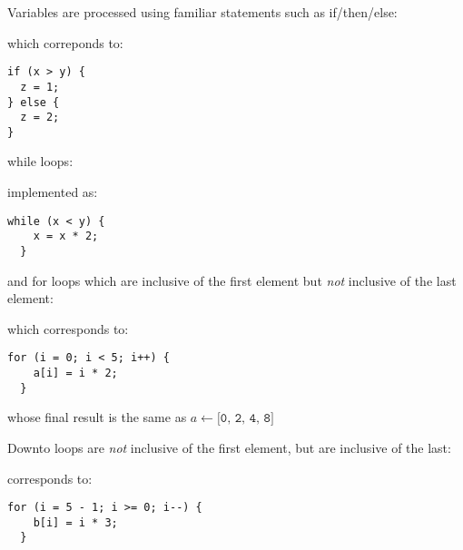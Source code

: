 \clearpage

\noindent
Variables are processed using familiar statements such as if/then/else:
\par
\noindent
\begin{algorithm}[H]
  \DontPrintSemicolon
\end{algorithm}
\par
\noindent
which correponds to:
\begin{Verbatim}[xleftmargin=.25in]
if (x > y) {
  z = 1;
} else {
  z = 2;
}
\end{Verbatim}
while loops:
\par
\noindent
\begin{algorithm}[H]
  \DontPrintSemicolon
\end{algorithm}
\par
\noindent
implemented as:
\begin{Verbatim}[xleftmargin=.25in]
  while (x < y) {
    x = x * 2;
  }
\end{Verbatim}
and for loops which are inclusive of the first element
but \textit{not} inclusive of the last element:
\par
\noindent
\begin{algorithm}[H]
  \DontPrintSemicolon
\end{algorithm}
\par
\noindent
which corresponds to:
\begin{Verbatim}[xleftmargin=.25in]
  for (i = 0; i < 5; i++) {
    a[i] = i * 2;
  }
\end{Verbatim}
whose final result is the same as $a \leftarrow \texttt{[0, 2, 4, 8]}$
\par
\noindent
Downto loops are \textit{not} inclusive of the first element,
but are inclusive of the last:
\par
\noindent
\begin{algorithm}[H]
  \DontPrintSemicolon
\end{algorithm}
\par
\noindent
corresponds to:
\begin{Verbatim}[xleftmargin=.25in]
  for (i = 5 - 1; i >= 0; i--) {
    b[i] = i * 3;
  }
\end{Verbatim}

